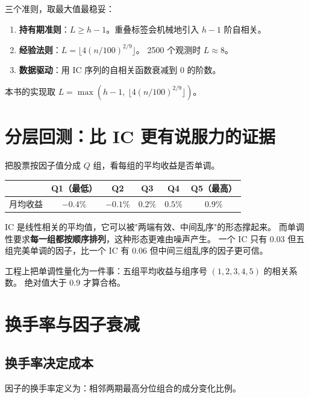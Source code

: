 三个准则，取最大值最稳妥：

\begin{enumerate}
  \item \textbf{持有期准则}：$L \ge h - 1$。重叠标签会机械地引入 $h-1$ 阶自相关。
  \item \textbf{经验法则}：$L = \lfloor 4(n/100)^{2/9}\rfloor$。
        2500 个观测时 $L\approx 8$。
  \item \textbf{数据驱动}：用 IC 序列的自相关函数衰减到 0 的阶数。
\end{enumerate}

本书的实现取 $L=\max(h-1,\ \lfloor 4(n/100)^{2/9}\rfloor)$。

\section{分层回测：比 IC 更有说服力的证据}

把股票按因子值分成 $Q$ 组，看每组的平均收益是否单调。

\begin{center}
\begin{tabular}{@{}lccccc@{}}
\toprule
 & Q1（最低） & Q2 & Q3 & Q4 & Q5（最高） \\
\midrule
月均收益 & $-0.4\%$ & $-0.1\%$ & $0.2\%$ & $0.5\%$ & $0.9\%$ \\
\bottomrule
\end{tabular}
\end{center}

\begin{keybox}[为什么单调性比 IC 重要]
IC 是线性相关的平均值，它可以被"两端有效、中间乱序"的形态撑起来。
而单调性要求\textbf{每一组都按顺序排列}，这种形态更难由噪声产生。
一个 IC 只有 $0.03$ 但五组完美单调的因子，比一个 IC 有 $0.06$ 但中间三组乱序的因子更可信。
\end{keybox}

工程上把单调性量化为一件事：五组平均收益与组序号 $(1,2,3,4,5)$ 的相关系数。
绝对值大于 $0.9$ 才算合格。

\section{换手率与因子衰减}

\subsection{换手率决定成本}

因子的换手率定义为：相邻两期最高分位组合的成分变化比例。

